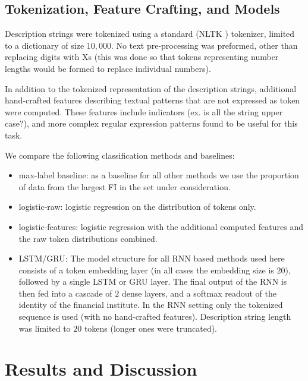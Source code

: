 \documentclass[sigconf]{acmart}
\begin{document}
\subsection{Tokenization, Feature Crafting, and Models}
\label{subs:tokens-features}

Description strings were tokenized using a standard (NLTK \cite{bird2004nltk}) tokenizer, limited to a dictionary of size $10,000$. No text pre-processing was preformed, other than replacing digits with Xs (this was done so that tokens representing number lengths would be formed to replace individual numbers). 

In addition to the tokenized representation of the description strings, additional hand-crafted features describing textual patterns that are not expressed as token were computed. These features include indicators (ex. is all the string upper case?), and more complex regular expression patterns found to be useful for this task. 

\noindent We compare the following classification methods and baselines:

\begin{itemize}
\item max-label baseline: as a baseline for all other methods we use the proportion of data from the largest FI in the set under consideration. 

\item logistic-raw: logistic regression on the distribution of tokens only.

\item logistic-features: logistic regression with the additional computed features and the raw token distributions combined.

\item LSTM/GRU: The model structure for all RNN based methods used here consists of a token embedding layer (in all cases the embedding size is $20$), followed by a single LSTM or GRU layer. The final output of the RNN is then fed into a cascade of $2$ dense layers, and a softmax readout of the identity of the financial institute. In the RNN setting only the tokenized sequence is used (with no hand-crafted features). Description string length was limited to $20$ tokens (longer ones were truncated). 
\end{itemize}
 

\section{Results and Discussion}
\label{sec:results}
\end{document}
